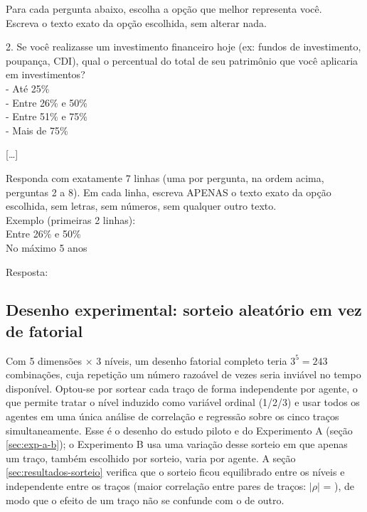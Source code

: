 \begin{quadro}[htbp]
    \caption{Instrução enviada ao modelo para o IPA}
    \label{quadro:prompt-ipa}
    \begin{promptbox}
    Para cada pergunta abaixo, escolha a opção que melhor representa você.\\
    Escreva o texto exato da opção escolhida, sem alterar nada.

    2. Se você realizasse um investimento financeiro hoje (ex: fundos de investimento, poupança, CDI), qual o percentual do total de seu patrimônio que você aplicaria em investimentos?\\
    \hspace*{1.5em}- Até 25\%\\
    \hspace*{1.5em}- Entre 26\% e 50\%\\
    \hspace*{1.5em}- Entre 51\% e 75\%\\
    \hspace*{1.5em}- Mais de 75\%

    {[\dots]} 

    Responda com exatamente 7 linhas (uma por pergunta, na ordem acima, perguntas 2 a 8). Em cada linha, escreva APENAS o texto exato da opção escolhida, sem letras, sem números, sem qualquer outro texto.\\
    Exemplo (primeiras 2 linhas):\\
    Entre 26\% e 50\%\\
    No máximo 5 anos

    Resposta:
    \end{promptbox}
\end{quadro}

\subsection{Desenho experimental: sorteio aleatório em vez de fatorial}
\label{sec:desenho-fatorial}

Com 5 dimensões $\times$ 3 níveis, um desenho fatorial completo teria
$3^5 = 243$ combinações, cuja repetição um número razoável de vezes seria
inviável no tempo disponível. Optou-se por sortear cada traço de forma
independente por agente, o que permite tratar o nível induzido como
variável ordinal (1/2/3) e usar todos os agentes em uma única análise de
correlação e regressão sobre os cinco traços simultaneamente. Esse é o
desenho do estudo piloto e do Experimento A (seção \ref{sec:exp-a-b}); o
Experimento B usa uma variação desse sorteio em que apenas um traço,
também escolhido por sorteio, varia por agente. A seção \ref{sec:resultados-sorteio} verifica que o sorteio
ficou equilibrado entre os níveis e independente entre os traços (maior
correlação entre pares de traços: $|\rho|$ = \aleatRhoMax), de modo que o
efeito de um traço não se confunde com o de outro.


